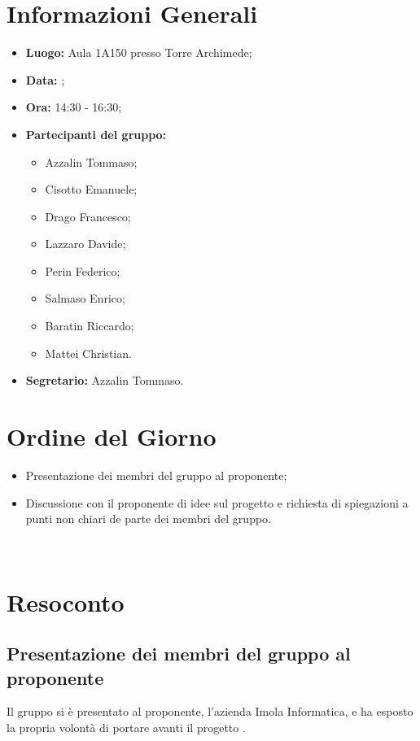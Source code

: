 \section{Informazioni Generali}
\begin{itemize}
\item \textbf{Luogo:} Aula 1A150 presso Torre Archimede;
\item \textbf{Data:} \Data;
\item \textbf{Ora:} 14:30 - 16:30;
\item \textbf{Partecipanti del gruppo:}
	\begin{itemize}
	\item Azzalin Tommaso; 
	\item Cisotto Emanuele; 
	\item Drago Francesco;
	\item Lazzaro Davide;
	\item Perin Federico;
	\item Salmaso Enrico;
	\item Baratin Riccardo;
	\item Mattei Christian.
	\end{itemize} 
\item \textbf{Segretario:} Azzalin Tommaso.
\end{itemize}

\clearpage

\section{Ordine del Giorno}
\begin{itemize}
	\item Presentazione dei membri del gruppo al proponente;
	\item Discussione con il proponente di idee sul progetto e richiesta di spiegazioni a punti non chiari de parte dei membri del gruppo.
\end{itemize}

~\\

\section{Resoconto}
\subsection{Presentazione dei membri del gruppo al proponente}
Il gruppo si è presentato al proponente, l'azienda Imola Informatica, e ha esposto la propria volontà di portare avanti il progetto \NomeProgetto.


